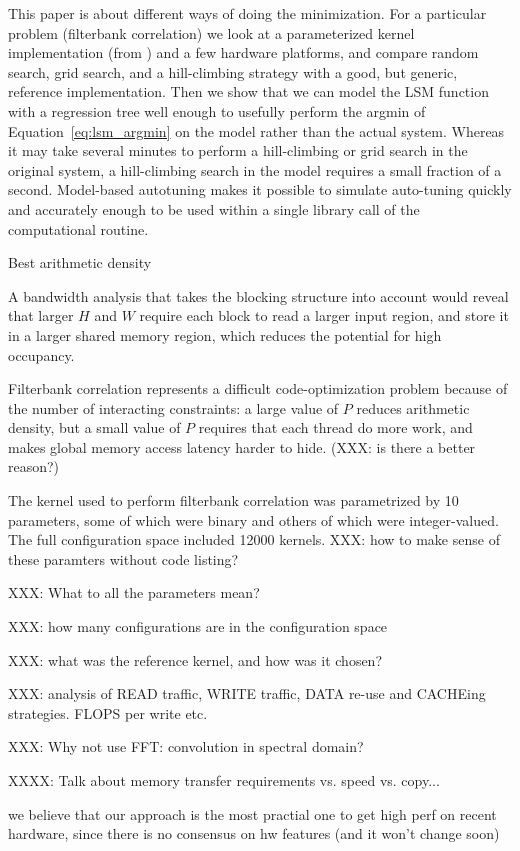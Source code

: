 \documentclass{sig-alternate}
\begin{document}
This paper is about different ways of doing the minimization.
For a particular problem (filterbank correlation) we
look at a parameterized kernel implementation (from \citet{pinto+cox:2011gcg})
and a few hardware platforms, and compare
random search, grid search, and a hill-climbing strategy with a good, but
generic, reference implementation.
Then we show that we can model the LSM function with a regression tree
well enough to usefully perform the argmin of Equation~\ref{eq:lsm_argmin}
on the model rather than the actual system. Whereas it may take several
minutes to perform a hill-climbing or grid search in the original system,
a hill-climbing search in the model requires a small fraction of a second.
Model-based autotuning makes it possible to simulate auto-tuning quickly and
accurately enough to be used within a single library call of the computational
routine.

Best arithmetic density

A bandwidth analysis that takes the blocking structure into account would
reveal that larger $H$ and $W$ require each block to read a larger input
region, and store it in a larger shared memory region, which reduces the
potential for high occupancy.

Filterbank correlation represents a difficult code-optimization problem
because of the number of interacting constraints: a large value of $P$ reduces
arithmetic density, but a small value of $P$ requires that each thread do more
work, and makes global memory access latency harder to hide. (XXX: is there a
better reason?)


The kernel used to perform
filterbank correlation was parametrized by 10 parameters, some of which
were binary and others of which were integer-valued. The full configuration
space included 12000 kernels.
XXX: how to make sense of these paramters without code listing?

XXX: What to all the parameters mean?

XXX: how many configurations are in the configuration space

XXX: what was the reference kernel, and how was it chosen?

XXX: analysis of READ traffic, WRITE traffic, DATA re-use and CACHEing
strategies. FLOPS per write etc.

XXX: Why not use FFT: convolution in spectral domain?

XXXX: Talk about memory transfer requirements vs. speed vs. copy...

we believe that our approach is the most practial one to get high perf on
recent hardware, since there is no consensus on hw features (and it won't
change soon)
\end{document}
